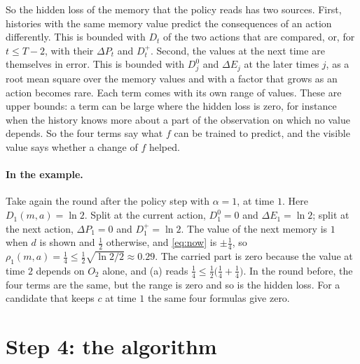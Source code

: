\documentclass[11pt]{article}
\theoremstyle{definition}
\newcommand{\dE}{\Delta E}
\newcommand{\dP}{\Delta P}
\begin{document}
So the hidden loss of the memory that the policy reads has two sources. First, histories with the same memory value predict the consequences of an action differently. This is bounded with $D_t$ of the two actions that are compared, or, for $t\le T-2$, with their $\dP_t$ and $D^+_t$. Second, the values at the next time are themselves in error. This is bounded with $D^0_j$ and $\dE_j$ at the later times $j$, as a root mean square over the memory values and with a factor that grows as an action becomes rare. Each term comes with its own range of values. These are upper bounds: a term can be large where the hidden loss is zero, for instance when the history knows more about a part of the observation on which no value depends. So the four terms say what $f$ can be trained to predict, and the visible value says whether a change of $f$ helped.

\paragraph{In the example.} Take again the round after the policy step with $\alpha=1$, at time $1$. Here $D_1(m,a)=\ln2$. Split at the current action, $D^0_1=0$ and $\dE_1=\ln2$; split at the next action, $\dP_1=0$ and $D^+_1=\ln2$. The value of the next memory is $1$ when $d$ is shown and $\tfrac12$ otherwise, and \eqref{eq:now} is $\pm\tfrac14$, so $\rho_1(m,a)=\tfrac14\le\tfrac12\sqrt{\ln2/2}\approx0.29$. The carried part is zero because the value at time $2$ depends on $O_2$ alone, and (a) reads $\tfrac14\le\tfrac12\big(\tfrac14+\tfrac14\big)$. In the round before, the four terms are the same, but the range is zero and so is the hidden loss. For a candidate that keeps $c$ at time $1$ the same four formulas give zero.

\section{Step 4: the algorithm}\label{sec:algo}
\end{document}
